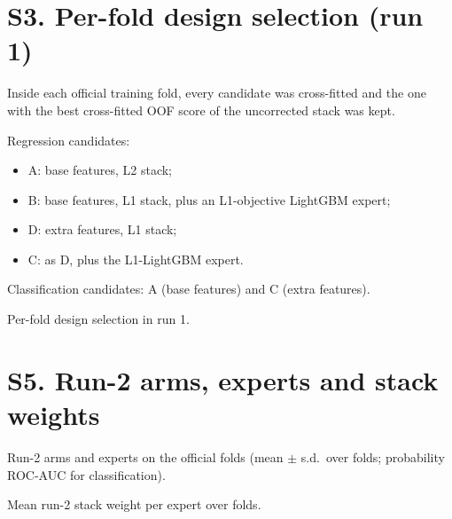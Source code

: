 \documentclass[11pt]{article}
\begin{document}


\section*{S3. Per-fold design selection (run 1)}
Inside each official training fold, every candidate was cross-fitted and the one with the best cross-fitted OOF score of the uncorrected stack was kept.

Regression candidates:
\begin{itemize}
\item A: base features, L2 stack;
\item B: base features, L1 stack, plus an L1-objective LightGBM expert;
\item D: extra features, L1 stack;
\item C: as D, plus the L1-LightGBM expert.
\end{itemize}
Classification candidates: A (base features) and C (extra features).

\begin{table}[h]
\centering
\caption{Per-fold design selection in run 1.}
\label{tab:ds}
\begin{adjustbox}{max width=\textwidth}

\end{adjustbox}
\end{table}

\clearpage
\renewcommand{\thesection}{S4}


\clearpage
\section*{S5. Run-2 arms, experts and stack weights}
\begin{table}[h]
\centering
\caption{Run-2 arms and experts on the official folds (mean $\pm$ s.d.\ over folds; probability ROC-AUC for classification).}
\begin{adjustbox}{max width=\textwidth}

\end{adjustbox}
\end{table}
\begin{table}[h]
\centering
\caption{Mean run-2 stack weight per expert over folds.}
\begin{adjustbox}{max width=\textwidth}

\end{adjustbox}
\end{table}
\end{document}
